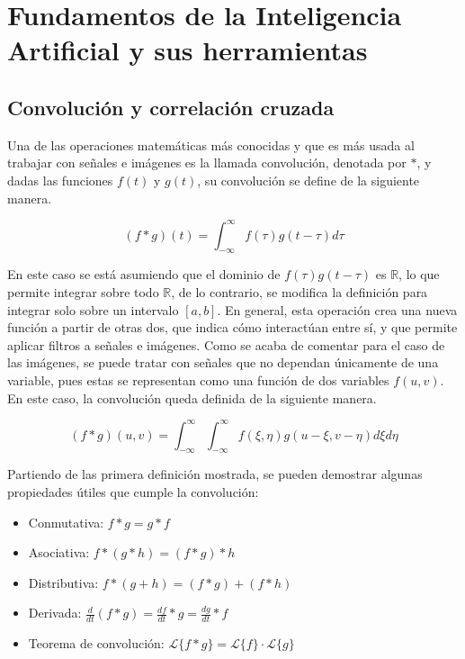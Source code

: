 \chapter{Fundamentos de la Inteligencia Artificial y sus herramientas}

	\section{Convolución y correlación cruzada}
	
		Una de las operaciones matemáticas más conocidas y que es más usada al trabajar con señales e imágenes es la llamada convolución, denotada por $\ast$, y dadas las funciones $f(t)$ y $g(t)$, su convolución se define de la siguiente manera. 
		
		$$
		(f \ast g)(t) = \int_{-\infty}^\infty f(\tau)g(t - \tau) d\tau
		$$
		
		En este caso se está asumiendo que el dominio de $f(\tau)g(t - \tau)$ es $\mathbb{R}$, lo que permite integrar sobre todo $\mathbb{R}$, de lo contrario, se modifica la definición para integrar solo sobre un intervalo $[a, b]$. En general, esta operación crea una nueva función a partir de otras dos, que indica cómo interactúan entre sí, y que permite aplicar filtros a señales e imágenes. Como se acaba de comentar para el caso de las imágenes, se puede tratar con señales que no dependan únicamente de una variable, pues estas se representan como una función de dos variables $f(u, v)$. En este caso, la convolución queda definida de la siguiente manera. 
		
		$$
		(f \ast g)(u, v) = \int_{-\infty}^\infty\int_{-\infty}^\infty f(\xi, \eta)g(u - \xi, v - \eta) d\xi d\eta
		$$
		
		Partiendo de las primera definición mostrada, se pueden demostrar algunas propiedades útiles que cumple la convolución: 
		
		\begin{itemize}
			\item Conmutativa: $f \ast g = g \ast f$
			\item Asociativa: $f \ast (g \ast h) = (f \ast g) \ast h$
			\item Distributiva: $f \ast (g + h) = (f \ast g) + (f \ast h)$
			\item Derivada: $\frac{d}{dt}(f \ast g) = \frac{df}{dt}\ast g = \frac{dg}{dt}\ast f$
			\item Teorema de convolución: $\mathscr{L}\{f \ast g\} = \mathscr{L}\{f\} \cdot \mathscr{L}\{g\}$
		\end{itemize}
		
